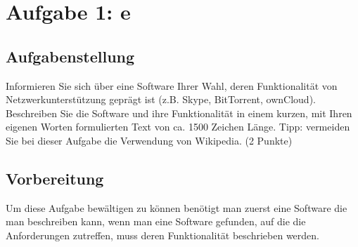 \newpage

\section{Aufgabe 1: e}

\subsection{Aufgabenstellung}
Informieren Sie sich über eine Software Ihrer Wahl, deren Funktionalität von Netzwerkunterstützung geprägt ist (z.B. Skype, BitTorrent, ownCloud). Beschreiben Sie die Software und ihre Funktionalität in einem kurzen, mit Ihren eigenen Worten formulierten Text von ca. 1500 Zeichen Länge. Tipp: vermeiden Sie bei dieser Aufgabe die Verwendung von Wikipedia. (2 Punkte)

\subsection{Vorbereitung}
Um diese Aufgabe bewältigen zu können benötigt man zuerst eine Software die man beschreiben kann, wenn man eine Software gefunden, auf die die Anforderungen zutreffen, muss deren Funktionalität beschrieben werden.

